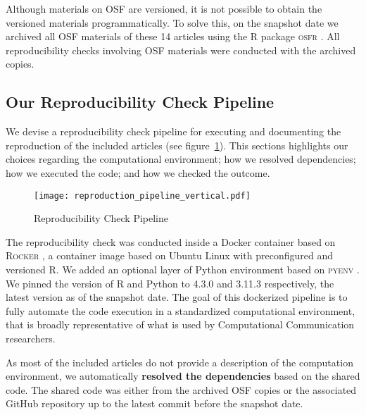 
Although materials on OSF are versioned, it is not possible to obtain the versioned materials programmatically. To solve this, on the snapshot date we archived all OSF materials of these 14 articles using the R package \textsc{osfr} \parencite[]{osfr}. All reproducibility checks involving OSF materials were conducted with the archived copies.

\subsection{Our Reproducibility Check Pipeline}

We devise a reproducibility check pipeline for executing and documenting the reproduction of the included articles (see figure~\ref{fig:pipeline}).
This sections highlights our choices regarding the computational environment; how we resolved dependencies; how we executed the code; and how we checked the outcome.

\begin{figure}
\texttt{[image: reproduction\_pipeline\_vertical.pdf]}
\caption{Reproducibility Check Pipeline}
\label{fig:pipeline}
\end{figure}

The reproducibility check was conducted inside a Docker container based on \textsc{Rocker} \parencite{boettiger:2017:IR}, a container image based on Ubuntu Linux with preconfigured and versioned R. We added an optional layer of Python environment based on \textsc{pyenv} \parencite{pyenv}. We pinned the version of R and Python to 4.3.0 and 3.11.3 respectively, the latest version as of the snapshot date. The goal of this dockerized pipeline is to fully automate the code execution in a standardized computational environment, that is broadly representative of what is used by Computational Communication researchers.


As most of the included articles do not provide a description of the computation environment, we automatically \textbf{resolved the dependencies} based on the shared code. The shared code was either from the archived OSF copies or the associated GitHub repository up to the latest commit before the snapshot date.

